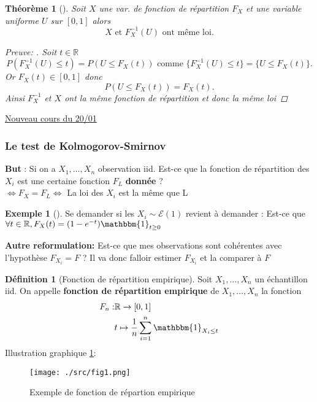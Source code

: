 \documentclass{article}
\theoremstyle{plain}%
\newtheorem{thm}{Théorème}[section]
\theoremstyle{definition}
\newtheorem{defn}{Définition}[section]
\newtheorem{exmp}{Exemple}[section]
\theoremstyle{remark}
\begin{document}
\begin{thm}[]
    Soit $ X $ une var. de fonction de répartition $ F_X $ et une variable uniforme $ U $ sur $ [0,1] $ alors 
    \[
        X \text{ et } F_X^{-1}(U) \text{ ont même loi}
    .\]

    \begin{proof}[Preuve: ]
        Soit $ t \in \mathbb{R} $ 
        \[
            P(F_X^{-1}(U) \leq t) = P(U \leq F_X(t)) \text{ comme } \{F_X^{-1} (U) \leq t\} = \{U \leq F_X(t)\}
        .\]
        Or $ F_X(t) \in [0,1] $ donc 
        \[
            P(U \leq F_X(t)) = F_X(t)
        .\]
        Ainsi $ F_X^{-1} $ et $ X $ ont la même fonction de répartition et donc la même loi
    \end{proof}
\end{thm}

\underline{Nouveau cours du 20/01} \\

\subsubsection{Le test de Kolmogorov-Smirnov}

\textbf{But} : Si on a $ X_1, \dots, X_n $ observation iid. Est-ce que la fonction de répartition des $ X_i $ est une certaine fonction $ F_L $ \textbf{donnée} ? \\
$ \Leftrightarrow F_X = F_L \Leftrightarrow $  La loi des $ X_i $ est la même que L \\

\begin{exmp}[]
    Se demander si les $  X_i \sim \mathcal{E}(1) $ revient à demander : Est-ce que $ \forall t \in \mathbb{R}, F_X(t) = (1 - e^{-t}) \mathbbm{1}_{t \geq 0} $ 
\end{exmp}

\textbf{Autre reformulation:} Est-ce que mes observations sont cohérentes avec l'hypothèse $ F_{X_i}= F $ ? Il va donc falloir estimer $ F_{X_i} $ et la comparer à $ F $ 

\begin{defn}[Fonction de répartition empirique]
    Soit $ X_1, \dots, X_n $ un échantillon iid. On appelle \textbf{fonction de répartition empirique} de $ X_1, \dots, X_n $ la fonction 
    \begin{align*}
        F_n :& \mathbb{R} \to [0,1] \\
            & t \mapsto \frac{1}{n}\sum_{i=1}^{n} \mathbbm{1}_{X_i \leq t}
    \end{align*}
    Illustration graphique \ref{fig1}:
    \begin{figure}[!htbp]
        \centering
        \texttt{[image: ./src/fig1.png]}
        \caption{Exemple de fonction de répartion empirique}
        \label{fig1}
    \end{figure}
\end{defn}
\end{document}
